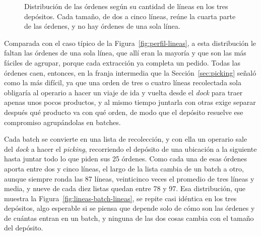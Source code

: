 \begin{figure}[ht]
    \centering
    \caption{Distribución de las órdenes según su cantidad de líneas en los tres depósitos. Cada tamaño, de dos a cinco líneas, reúne la cuarta parte de las órdenes, y no hay órdenes de una sola línea.}
    \label{fig:lineas-orden}
\end{figure}

Comparada con el caso típico de la Figura~\ref{fig:perfil-lineas}, a esta distribución le faltan las órdenes de una sola línea, que allí eran la mayoría y que son las más fáciles de agrupar, porque cada extracción ya completa un pedido.
Todas las órdenes caen, entonces, en la franja intermedia que la Sección~\ref{sec:picking} señaló como la más difícil, ya que una orden de tres o cuatro líneas recolectada sola obligaría al operario a hacer un viaje de ida y vuelta desde el \emph{dock} para traer apenas unos pocos productos, y al mismo tiempo juntarla con otras exige separar después qué producto va con qué orden, de modo que el depósito resuelve ese compromiso agrupándolas en batches.

Cada batch se convierte en una lista de recolección, y con ella un operario sale del \emph{dock} a hacer el \emph{picking}, recorriendo el depósito de una ubicación a la siguiente hasta juntar todo lo que piden sus 25 órdenes.
Como cada una de esas órdenes aporta entre dos y cinco líneas, el largo de la lista cambia de un batch a otro, aunque siempre ronda las 87 líneas, veinticinco veces el promedio de tres líneas y media, y nueve de cada diez listas quedan entre 78 y 97.
Esa distribución, que muestra la Figura~\ref{fig:lineas-batch-lineas}, se repite casi idéntica en los tres depósitos, algo esperable si se piensa que depende solo de cómo son las órdenes y de cuántas entran en un batch, y ninguna de las dos cosas cambia con el tamaño del depósito.

